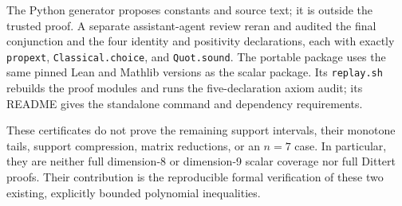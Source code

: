 \documentclass[11pt]{article}
\newcommand{\code}[1]{\texttt{\small #1}}
\begin{document}
The Python generator proposes constants and source text; it is outside
the trusted proof. A separate assistant-agent review reran and audited
the final conjunction and the four identity and positivity declarations, each
with exactly \code{propext}, \code{Classical.choice}, and
\code{Quot.sound}. The portable package uses the same pinned Lean
and Mathlib versions as the scalar package. Its \code{replay.sh}
rebuilds the proof modules and runs the five-declaration axiom audit;
its README gives the standalone command and dependency requirements.

These certificates do not prove the remaining support intervals,
their monotone tails, support compression, matrix reductions, or an
$n=7$ case. In particular, they are neither full dimension-8 or
dimension-9 scalar coverage nor full Dittert proofs. Their contribution
is the reproducible formal verification of these two existing,
explicitly bounded polynomial inequalities.



\end{document}
